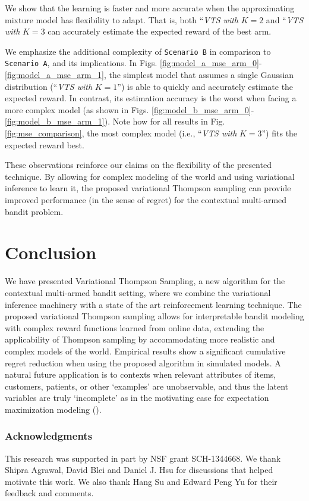 \documentclass[10pt]{article}
\newcommand{\ie}{i.e., }
\begin{document}
We show that the learning is faster and more accurate when the approximating mixture model has flexibility to adapt. That is, both ``\textit{VTS with }$K=2$ and ``\textit{VTS with }$K=3$ can accurately estimate the expected reward of the best arm.

We emphasize the additional complexity of \texttt{Scenario B} in comparison to \texttt{Scenario A}, and its implications. In Figs. \ref{fig:model_a_mse_arm_0}-\ref{fig:model_a_mse_arm_1}, the simplest model that assumes a single Gaussian distribution (``\textit{VTS with }$K=1$'') is able to quickly and accurately estimate the expected reward. In contrast, its estimation accuracy is the worst when facing a more complex model (as shown in Figs. \ref{fig:model_b_mse_arm_0}-\ref{fig:model_b_mse_arm_1}). Note how for all results in Fig. \ref{fig:mse_comparison}, the most complex model (\ie ``\textit{VTS with }$K=3$'') fits the expected reward best.

These observations reinforce our claims on the flexibility of the presented technique. By allowing for complex modeling of the world and using variational inference to learn it, the proposed variational Thompson sampling can provide improved performance (in the sense of regret) for the contextual multi-armed bandit problem.

\section{Conclusion}
\label{sec:conclusion}

We have presented Variational Thompson Sampling, a new algorithm for the contextual multi-armed bandit setting, where we combine the variational inference machinery with a state of the art reinforcement learning technique. The proposed variational Thompson sampling allows for interpretable bandit modeling with complex reward functions learned from online data, extending the applicability of Thompson sampling by accommodating more realistic and complex models of the world. Empirical results show a significant cumulative regret reduction when using the proposed algorithm in simulated models. A natural future application is to contexts when relevant attributes of items, customers, patients, or other `examples' are unobservable, and thus the latent variables are truly `incomplete' as in the motivating case for expectation maximization modeling (\cite{j-Dempster1977}).

\subsubsection*{Acknowledgments}
This research was supported in part by NSF grant SCH-1344668. We thank Shipra Agrawal, David Blei and Daniel J. Hsu for discussions that helped motivate this work. We also thank Hang Su and Edward Peng Yu for their feedback and comments.




\end{document}
